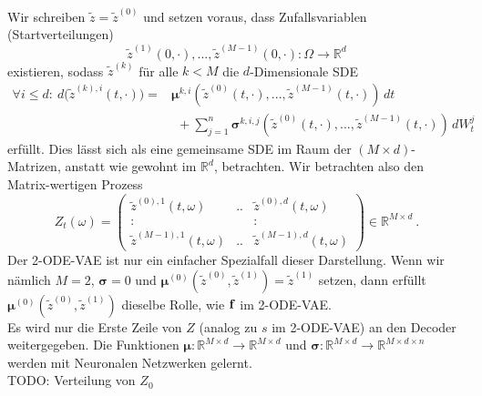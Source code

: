 \documentclass[12pt]{article}
\newcommand{\R}{\mathbb{R}}
\newcommand{\tz}{\widetilde{z}}
\newcommand{\bbf}{\bold{f}}
\newcommand{\bmu}{\bm{\mu}}
\newcommand{\bsig}{\bm{\sigma}}
\begin{document}
	Wir schreiben $\tz = \tz^{(0)}$ und setzen voraus, dass Zufallsvariablen (Startverteilungen)
	$$\tz^{(1)}(0,\cdot) ,..., \tz^{(M-1)}(0,\cdot): \Omega \rightarrow \R^d$$
	existieren, sodass $\tz^{(k)}$ für alle $k < M$ die $d$-Dimensionale SDE
	\begin{align*}
	\forall i \leq d: \ d \big(\tz^{(k),i}(t,\cdot)\big) = & \bmu^{k,i}(\tz^{(0)}(t,\cdot),...,\tz^{(M-1)}(t,\cdot)) \, dt\\
	& \ \ + \sum\limits_{j=1}^n \bsig^{k,i,j}(\tz^{(0)}(t,\cdot),...,\tz^{(M-1)}(t,\cdot)) \, dW^j_t
	\end{align*}
	erfüllt. Dies lässt sich als eine gemeinsame SDE im Raum der $(M \times d)$-Matrizen, anstatt wie gewohnt im $\R^d$, betrachten. Wir betrachten also den Matrix-wertigen Prozess
	$$ Z_t(\omega) = \begin{pmatrix}
	\tz^{(0),1}(t,\omega) & .. & \tz^{(0),d}(t,\omega)\\
	: & & : \\
	\tz^{(M-1),1}(t,\omega) & .. & \tz^{(M-1),d}(t,\omega)
	\end{pmatrix} \in \R^{M \times d} \ .$$
	Der 2-ODE-VAE ist nur ein einfacher Spezialfall dieser Darstellung. Wenn wir nämlich $M=2$, $\bsig = 0$ und $\bmu^{(0)}(\tz^{(0)},\tz^{(1)}) = \tz^{(1)}$ setzen, dann erfüllt $\bmu^{(0)}(\tz^{(0)},\tz^{(1)})$ dieselbe Rolle, wie $\bbf$ im 2-ODE-VAE.\\
	Es wird nur die Erste Zeile von $Z$ (analog zu $s$ im 2-ODE-VAE) an den Decoder weitergegeben. Die Funktionen $\bmu : \R^{M \times d} \rightarrow \R^{M \times d}$ und $\bsig : \R^{M \times d} \rightarrow \R^{M \times d \times n}$ werden mit Neuronalen Netzwerken gelernt.\\
	TODO: Verteilung von $Z_0$






	\newpage
\end{document}
